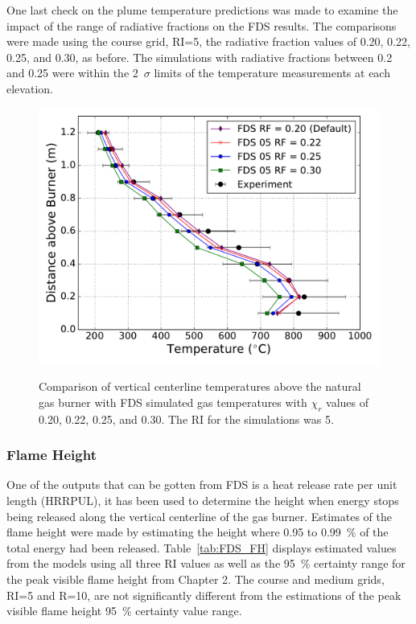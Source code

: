 \documentclass[twoside]{uocthesis}
\begin{document}
{One last check on the plume temperature predictions was made to examine the impact of the range of radiative fractions on the FDS results.  The comparisons were made using the course grid, RI=5, the radiative fraction values of 0.20, 0.22, 0.25, and 0.30, as before. The simulations with radiative fractions between 0.2 and 0.25 were within the 2~$\sigma$ limits of the temperature measurements at each elevation.   

\begin{figure}
	\includegraphics[width=5in]{../Figures/FHNG01_RF_RI5} \\
	\caption[Comparison of vertical centerline temperatures above the natural gas burner with FDS simulated gas temperatures based on varied $\chi_r$.]{Comparison of vertical centerline temperatures above the natural gas burner with FDS simulated gas temperatures with $\chi_r$ values of 0.20, 0.22, 0.25, and 0.30.  The RI for the simulations was 5.}
	\label{FHNG01_RF_RI5}
\end{figure}

\subsubsection{Flame Height}

One of the outputs that can be gotten from FDS is a heat release rate per unit length (HRRPUL), it has been used to determine the height when energy stops being released along the vertical centerline of the gas burner.  Estimates of the flame height were made by estimating the height where 0.95 to 0.99~$\%$ of the total energy had been released. Table~\ref{tab:FDS_FH} displays estimated values from the models using all three RI values as well as the 95~$\%$ certainty range for the peak visible flame height from Chapter 2.  The course and medium grids, RI=5 and R=10, are not significantly different from the estimations of the peak visible flame height 95~$\%$ certainty value range.     

}
\end{document}
